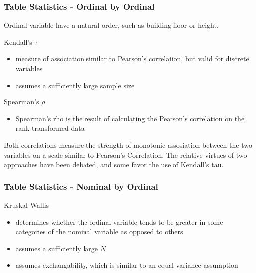 \documentclass[xcolor={table},c]{beamer}
\begin{document}
\begin{frame}[shrink=4.5]\frametitle{Table Statistics - Ordinal by Ordinal}
Ordinal variable have a natural order, such as building floor or height. 
\begin{alertblock}{Kendall's $\tau$}
\begin{itemize} 
   \item measure of association similar to Pearson's correlation, but valid for discrete variables
   \item assumes a sufficiently large sample size 
\end{itemize}
\end{alertblock}
\begin{alertblock}{Spearman's $\rho$}
\begin{itemize} 
   \item Spearman's rho is the result of calculating the Pearson's correlation on the rank transformed data
\end{itemize}
\end{alertblock}
Both correlations measure the strength of monotonic assosiation between the two variables on a scale similar to Pearson's Correlation. The relative virtues of two approaches have been debated, and some favor the use of Kendall's tau. 
\end{frame}

\begin{frame}\frametitle{Table Statistics - Nominal by Ordinal}
\begin{alertblock}{Kruskal-Wallis}
\begin{itemize} 
   \item determines whether the ordinal variable tends to be greater in some categories of the nominal variable as opposed to others
   \item assumes a sufficiently large $N$
   \item assumes exchangability, which is similar to an equal variance assumption
\end{itemize}
\end{alertblock}
\end{frame}
\end{document}
